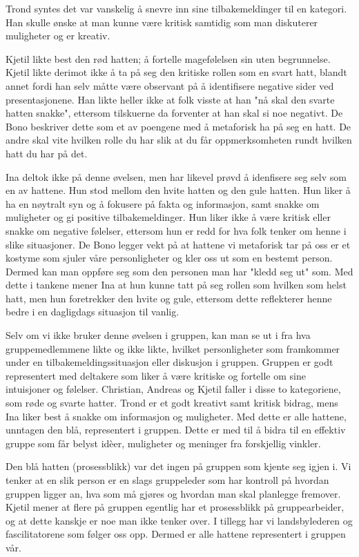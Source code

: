 Trond syntes det var vanskelig å snevre inn sine tilbakemeldinger til en kategori. Han skulle ønske at man kunne være kritisk samtidig som man diskuterer muligheter og er kreativ. 

Kjetil likte best den rød hatten; å fortelle magefølelsen sin uten begrunnelse. Kjetil likte derimot ikke å ta på seg den kritiske rollen som en svart hatt, blandt annet fordi han selv måtte være observant på å identifisere negative sider ved presentasjonene. Han likte heller ikke at folk visste at han "nå skal den svarte hatten snakke", ettersom tilskuerne da forventer at han skal si noe negativt. De Bono beskriver dette som et av poengene med å metaforisk ha på seg en hatt. De andre skal vite hvilken rolle du har slik at du får oppmerksomheten rundt hvilken hatt du har på det. 

Ina deltok ikke på denne øvelsen, men har likevel prøvd å idenfisere seg selv som en av hattene. Hun stod mellom den hvite hatten og den gule hatten. Hun liker å ha en nøytralt syn og å fokusere på fakta og informasjon, samt snakke om muligheter og gi positive tilbakemeldinger. Hun liker ikke å være kritisk eller snakke om negative følelser, ettersom hun er redd for hva folk tenker om henne i slike situasjoner. De Bono legger vekt på at hattene vi metaforisk tar på oss er et kostyme som sjuler våre personligheter og kler oss ut som en bestemt person. Dermed kan man oppføre seg som den personen man har "kledd seg ut" som. Med dette i tankene mener Ina at hun kunne tatt på seg rollen som hvilken som helst hatt, men hun foretrekker den hvite og gule, ettersom dette reflekterer henne bedre i en dagligdags situasjon til vanlig.

Selv om vi ikke bruker denne øvelsen i gruppen, kan man se ut i fra hva gruppemedlemmene likte og ikke likte, hvilket personligheter som framkommer under en tilbakemeldingssituasjon eller diskusjon i gruppen. Gruppen er godt representert med deltakere som liker å være kritiske og fortelle om sine intuisjoner og følelser. Christian, Andreas og Kjetil faller i disse to kategoriene, som røde og svarte hatter. Trond er et godt kreativt samt kritisk bidrag, mens Ina liker best å snakke om informasjon og muligheter. Med dette er alle hattene, unntagen den blå, representert i gruppen. Dette er med til å bidra til en effektiv gruppe som får belyst idèer, muligheter og meninger fra forskjellig vinkler. 

Den blå hatten (prosessblikk) var det ingen på gruppen som kjente seg igjen i. Vi tenker at en slik person er en slags gruppeleder som har kontroll på hvordan gruppen ligger an, hva som må gjøres og hvordan man skal planlegge fremover. Kjetil mener at flere på gruppen egentlig har et prosessblikk på gruppearbeider, og at dette kanskje er noe man ikke tenker over. I tillegg har vi landsbylederen og fascilitatorene som følger oss opp. Dermed er alle hattene representert i gruppen vår.


